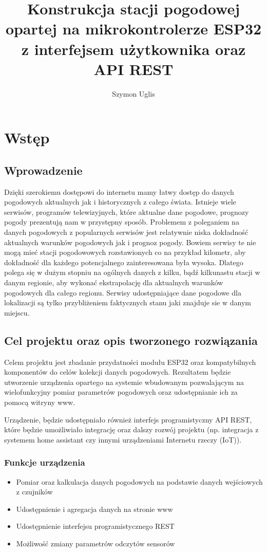 \documentclass[12pt,a4paper]{article}
\title{Konstrukcja stacji pogodowej opartej na mikrokontrolerze ESP32 z interfejsem użytkownika oraz API REST}
\author{Szymon Uglis}
\begin{document}
\justifying

\nocite{*}

\begin{titlepage}
    
\end{titlepage}

\tableofcontents{}
\pagebreak

\section{Wstęp}

\subsection{Wprowadzenie}
Dzięki szerokiemu dostępowi do internetu mamy łatwy dostęp do danych pogodowych aktualnych jak i historycznych z całego świata. Istnieje wiele serwisów, programów telewizyjnych, które aktualne dane pogodowe, prognozy pogody prezentują nam w przystępny sposób. Problemem z poleganiem na danych pogodowych z popularnych serwisów jest relatywnie niska dokładność aktualnych warunków pogodowych jak i prognoz pogody. Bowiem serwisy te nie mogą mieć stacji pogodowowych rozstawionych co na przykład kilometr, aby dokładność dla każdego potencjalnego zainteresowana była wysoka. Dlatego polega się w dużym stopniu na ogólnych danych z kilku, bądź kilkunastu stacji w danym regionie, aby wykonać ekstrapolację dla aktualnych warunków pogodowych dla całego regionu. Serwisy udostępniające dane pogodowe dla lokalizacji są tylko przybliżeniem faktycznych stanu jaki znajduje sie w danym miejscu.

\subsection{Cel projektu oraz opis tworzonego rozwiązania}

Celem projektu jest zbadanie przydatności modułu ESP32 oraz kompatybilnych komponentów do celów kolekcji danych pogodowych. Rezultatem będzie utworzenie urządzenia opartego na systemie wbudowanym pozwalającym na wielofunkcyjny pomiar parametrów pogodowych oraz udostępnianie ich za pomocą witryny www.

Urządzenie, będzie udostępniało również interfejs programistyczny API REST, które będzie umożliwiało integrację oraz dalszy rozwój projektu (np. integracja z systemem home assistant czy innymi urządzeniami Internetu rzeczy (IoT)).

\subsubsection{Funkcje urządzenia}
\begin{itemize}
    \item Pomiar oraz kalkulacja danych pogodowych na podstawie danych wejściowych z czujników
    \item Udostępnienie i agregacja danych na stronie www
    \item Udostępnienie interfejsu programistycznego REST
    \item Możliwość zmiany parametrów odczytów sensorów
\end{itemize}
\end{document}
